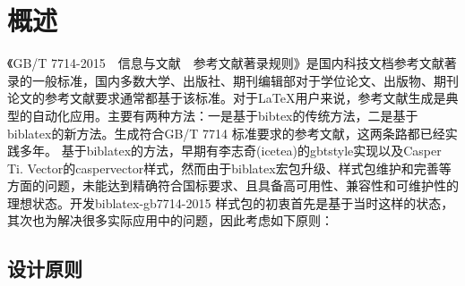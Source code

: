 \documentclass[11pt]{article} %
\begin{document}
\newpage
{}
\pagestyle{fancy}
\section{概述}

《GB/T 7714-2015~~信息与文献~~参考文献著录规则》是国内科技文档参考文献著录的一般标准，国内多数大学、出版社、期刊编辑部对于学位论文、出版物、期刊论文的参考文献要求通常都基于该标准。对于\LaTeX{}用户来说，参考文献生成是典型的自动化应用。主要有两种方法：一是基于bibtex的传统方法，二是基于biblatex的新方法。生成符合GB/T 7714 标准要求的参考文献，这两条路都已经实践多年。
基于biblatex的方法，早期有李志奇(icetea)的gbtstyle实现以及Casper Ti. Vector的caspervector样式，然而由于biblatex宏包升级、样式包维护和完善等方面的问题，未能达到精确符合国标要求、且具备高可用性、兼容性和可维护性的理想状态。开发biblatex-gb7714-2015 样式包的初衷首先是基于当时这样的状态，其次也为解决很多实际应用中的问题，因此考虑如下原则：

\subsection{设计原则}
\end{document}
